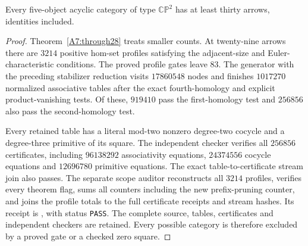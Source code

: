 \begin{theorem}
\label{A7:through29}
Every five-object acyclic category of type $\mathbb{CP}^2$ has
at least thirty arrows, identities included.
\end{theorem}
\begin{proof}
Theorem~\ref{A7:through28} treats smaller counts. At twenty-nine
arrows there are $3214$ positive hom-set profiles satisfying the
adjacent-size and Euler-characteristic conditions. The proved
profile gates leave $83$. The generator with the preceding
stabilizer reduction visits $17860548$ nodes and finishes
$1017270$ normalized associative tables after the exact fourth-homology
and explicit product-vanishing tests. Of these, $919410$ pass the
first-homology test and $256856$ also pass the second-homology test.

Every retained table has a literal mod-two nonzero degree-two
cocycle and a degree-three primitive of its square. The independent
checker verifies all $256856$ certificates, including $96138292$
associativity equations, $24374556$ cocycle equations and $12696780$
primitive equations. The exact table-to-certificate stream join
also passes. The separate scope auditor reconstructs all $3214$
profiles, verifies every theorem flag, sums all counters including
the new prefix-pruning counter, and joins the profile totals to
the full certificate receipts and stream hashes. Its receipt is
, with status
\texttt{PASS}. The complete source, tables, certificates and
independent checkers are retained. Every possible category is
therefore excluded by a proved gate or a checked zero square.
\end{proof}

